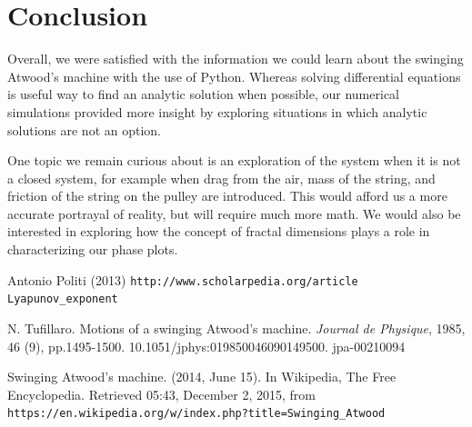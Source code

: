\documentclass{article}
\begin{document}
\section*{Conclusion}

Overall, we were satisfied with the information we could learn about the swinging Atwood's machine with the use of Python.  Whereas solving differential equations is useful way to find an analytic solution when possible, our numerical simulations provided more insight by exploring situations in which analytic solutions are not an option.  

One topic we remain curious about is an exploration of the system when it is not a closed system, for example when drag from the air, mass of the string, and friction of the string on the pulley are introduced.  This would afford us a more accurate portrayal of reality, but will require much more math.  We would also be interested in exploring how the concept of fractal dimensions plays a role in characterizing our phase plots.

\begin{thebibliography}{9}
Antonio Politi (2013) \texttt{http://www.scholarpedia.org/article Lyapunov\_exponent}
 
N. Tufillaro. Motions of a swinging Atwood's machine. \textit{Journal de Physique}, 1985, 46 (9),
	pp.1495-1500. 10.1051/jphys:019850046090149500. jpa-00210094
 
Swinging Atwood's machine. (2014, June 15). In Wikipedia, The Free Encyclopedia. Retrieved 05:43, 	December 2, 2015, from \texttt{https://en.wikipedia.org/w/index.php?title=Swinging\_Atwood}

\end{thebibliography}
\end{document}
